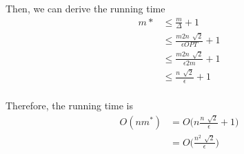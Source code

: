 Then, we can derive the running time
\begin{align*}
	m* &\leq \frac{m}{\Delta} + 1 \\
	&\leq \frac{m2n\,\sqrt[]{2}}{\epsilon OPT}+1 \\
	&\leq \frac{m2n\,\sqrt[]{2}}{\epsilon 2m}+1 \\
	&\leq \frac{n\,\sqrt[]{2}}{\epsilon}+1 \\
\end{align*}

Therefore, the running time is
\begin{align*}
	O\left(nm^*\right) &= O\Big(n\frac{n\,\sqrt[]{2}}{\epsilon}+1 \Big) \\
	&= O\Big(\frac{n^2\,\sqrt[]{2}}{\epsilon} \Big)
\end{align*}
